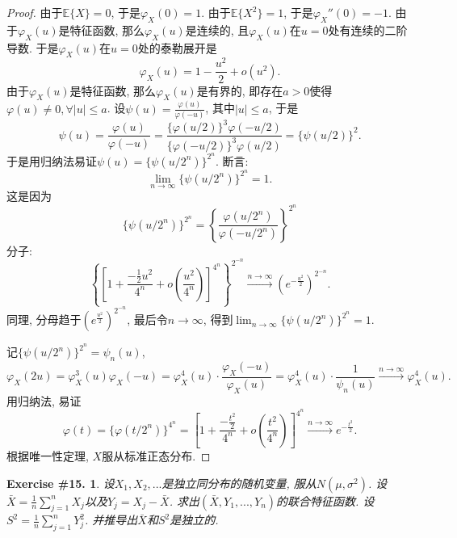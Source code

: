 \documentclass[UTF8, a4paper]{article}
\newtheorem{exercise}{Exercise \#15.}
\begin{document}
\begin{proof}
由于\(\mathbb{E}\{X\} = 0\), 于是\(\varphi_X(0) = 1\).
由于\(\mathbb{E}\{X^2\} = 1\), 于是\(\varphi_X''(0) = -1\).
由于\(\varphi_X(u)\)是特征函数, 那么\(\varphi_X(u)\)是连续的, 且\(\varphi_X(u)\)在\(u = 0\)处有连续的二阶导数.
于是\(\varphi_X(u)\)在\(u = 0\)处的泰勒展开是
$$
\varphi_X(u) = 1 - \frac{u^2}{2} + o(u^2).
$$
由于\(\varphi_X(u)\)是特征函数, 那么\(\varphi_X(u)\)是有界的, 即存在\(a > 0\)使得\(\varphi(u) \neq 0, \forall |u| \leq a\).
设\(\psi(u) = \frac{\varphi(u)}{\varphi(-u)}\), 其中\(|u| \leq a\), 于是
$$
\psi(u) = \frac{\varphi(u)}{\varphi(-u)} = \frac{\{\varphi(u/2)\}^3 \varphi(-u/2)}{\{\varphi(-u/2)\}^3 \varphi(u/2)} = \{\psi(u/2)\}^2.
$$
于是用归纳法易证\(\psi(u) = \{\psi(u/2^n)\}^{2^n}\).
断言:
$$
\lim_{n\to\infty} \{\psi(u/2^n)\}^{2^n} = 1.
$$
这是因为
$$
\{\psi(u/2^n)\}^{2^n}  = \left\{\frac{\varphi(u/2^n)}{\varphi(-u/2^n)}\right\}^{2^n} 
$$
分子:
$$
\left\{\left[1 + \frac{-\frac{1}{2}u^2}{4^n} + o\left(\frac{u^2}{4^n}\right)\right]^{4^n}\right\}^{2^{-n}} \xrightarrow{n \to \infty} \left(e^{-\frac{u^2}{2}}\right)^{2^{-n}}.
$$
同理, 分母趋于\(\left(e^{\frac{u^2}{2}}\right)^{2^{-n}}\), 最后令\(n\to\infty\), 得到\(\lim_{n\to\infty} \{\psi(u/2^n)\}^{2^n} = 1.\)

记\(\{\psi(u/2^n)\}^{2^n} = \psi_n(u)\), 
$$
\varphi_X(2u) = \varphi_X^3(u)\varphi_X(-u) = \varphi_X^4(u) \cdot \frac{\varphi_X(-u)}{\varphi_X(u)} = \varphi_X^4(u) \cdot \frac{1}{\psi_n(u)} \xrightarrow{n\to\infty} \varphi_X^4(u).
$$
用归纳法, 易证 
$$
\varphi(t) = \{\varphi(t/2^n)\}^{4^n} = \left[1 + \frac{-\frac{t^2}{2}}{4^n} + o\left(\frac{t^2}{4^n}\right)\right]^{4^n} \xrightarrow{n\to\infty} e^{-\frac{t^2}{2}}.
$$
根据唯一性定理, \(X\)服从标准正态分布.
\end{proof}


\begin{framed}
\begin{exercise}
设\(X_1, X_2, ...\)是独立同分布的随机变量, 服从\(N(\mu, \sigma^2)\).
设\(\bar{X} = \frac{1}{n}\sum_{j=1}^{n}X_j\)以及\(Y_j = X_j - \bar{X}\).
求出\((\bar{X}, Y_1, ..., Y_n)\)的联合特征函数.
设\(S^2 = \frac{1}{n}\sum_{j = 1}^{n}Y_j^2\).
并推导出\(\bar{X}\)和\(S^2\)是独立的.
\end{exercise}
\end{framed}
\end{document}
